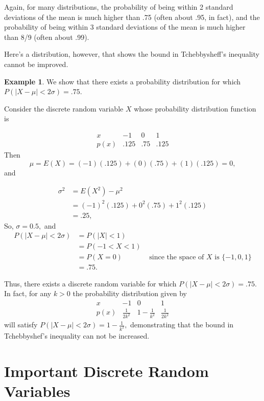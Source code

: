 \documentclass[
]{book}
\theoremstyle{definition}
\theoremstyle{definition}
\newtheorem{example}{Example}[chapter]
\theoremstyle{definition}
\theoremstyle{definition}
\theoremstyle{remark}
\begin{document}
Again, for many distributions, the probability of being within 2 standard deviations of the mean is much higher than .75 (often about .95, in fact), and the probability of being within 3 standard deviations of the mean is much higher than 8/9 (often about .99).

Here's a distribution, however, that shows the bound in Tchebbysheff's inequality cannot be improved.

\begin{example}
\protect\hypertarget{exm:tchebby-best-bound}{}\label{exm:tchebby-best-bound}We show that there exists a probability distribution for which \(P(|X-\mu|<2\sigma) = .75\).

Consider the discrete random variable \(X\) whose probability distribution function is

\[
\begin{array}{c|c|c|c}
x   &  -1 &  0 &  1   \\ \hline
p(x) & .125 & .75 & .125 
\end{array}
\]
Then \[\mu = E(X) = (-1)(.125) + (0)(.75) + (1)(.125) = 0,\] and

\begin{align*}
\sigma^2 &= E(X^2)-\mu^2 \\
  &= (-1)^2(.125) + 0^2(.75) + 1^2(.125)\\
  &=.25,
\end{align*}
So, \(\sigma = 0.5,\) and
\begin{align*}
P(|X - \mu| < 2 \sigma) &= P(|X| < 1) \\
&= P(-1 < X < 1) \\
&= P(X = 0) & \text{ since the space of $X$ is } \{-1,0,1\} \\
&= .75.
\end{align*}

Thus, there exists a discrete random variable for which \(P(|X - \mu| < 2 \sigma) = .75\). In fact, for any \(k > 0\) the probability distribution given by
\[
\begin{array}{c|c|c|c}
x   &  -1 &  0 &  1   \\ \hline
p(x) & \frac{1}{2k^2} & 1-\frac{1}{k^2} & \frac{1}{2k^2} 
\end{array}
\]
will satisfy \(P(|X-\mu|<2\sigma)=1-\frac{1}{k^2},\) demonstrating that the bound in Tchebbyshef's inequality can not be increased.
\end{example}

\chapter{Important Discrete Random Variables}\label{important-discrete-rv}
\end{document}
